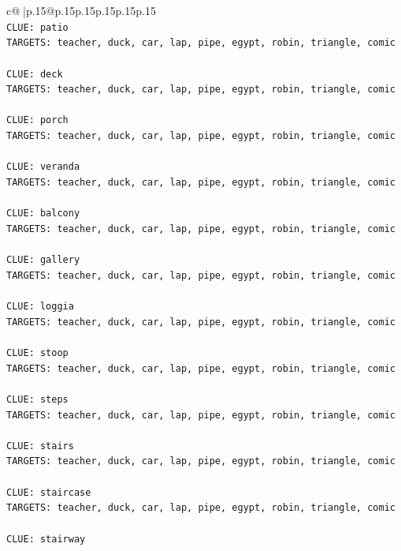 \documentclass{article}
\begin{document}
{\begin{supertabular}{c@{$\;$}|p{.15\linewidth}@{}p{.15\linewidth}p{.15\linewidth}p{.15\linewidth}p{.15\linewidth}p{.15\linewidth}}
{{{\\ 
\texttt{CLUE: patio} \\
\texttt{TARGETS: teacher, duck, car, lap, pipe, egypt, robin, triangle, comic} \\
\\ 
\texttt{CLUE: deck} \\
\texttt{TARGETS: teacher, duck, car, lap, pipe, egypt, robin, triangle, comic} \\
\\ 
\texttt{CLUE: porch} \\
\texttt{TARGETS: teacher, duck, car, lap, pipe, egypt, robin, triangle, comic} \\
\\ 
\texttt{CLUE: veranda} \\
\texttt{TARGETS: teacher, duck, car, lap, pipe, egypt, robin, triangle, comic} \\
\\ 
\texttt{CLUE: balcony} \\
\texttt{TARGETS: teacher, duck, car, lap, pipe, egypt, robin, triangle, comic} \\
\\ 
\texttt{CLUE: gallery} \\
\texttt{TARGETS: teacher, duck, car, lap, pipe, egypt, robin, triangle, comic} \\
\\ 
\texttt{CLUE: loggia} \\
\texttt{TARGETS: teacher, duck, car, lap, pipe, egypt, robin, triangle, comic} \\
\\ 
\texttt{CLUE: stoop} \\
\texttt{TARGETS: teacher, duck, car, lap, pipe, egypt, robin, triangle, comic} \\
\\ 
\texttt{CLUE: steps} \\
\texttt{TARGETS: teacher, duck, car, lap, pipe, egypt, robin, triangle, comic} \\
\\ 
\texttt{CLUE: stairs} \\
\texttt{TARGETS: teacher, duck, car, lap, pipe, egypt, robin, triangle, comic} \\
\\ 
\texttt{CLUE: staircase} \\
\texttt{TARGETS: teacher, duck, car, lap, pipe, egypt, robin, triangle, comic} \\
\\ 
\texttt{CLUE: stairway} \\
}}}
\end{supertabular}}
\end{document}

